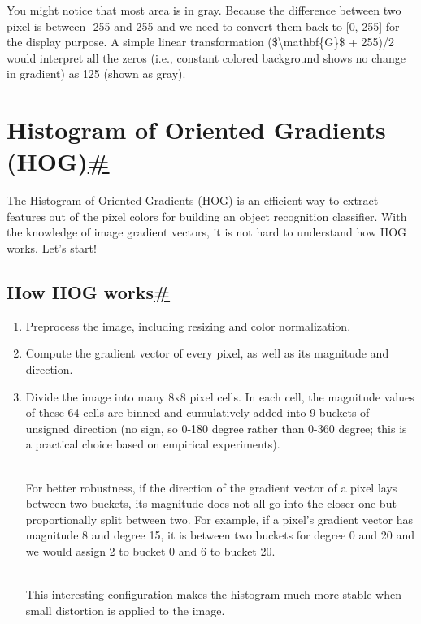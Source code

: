 You might notice that most area is in gray. Because the difference between two pixel is between -255 and 255 and we need to convert them back to {[}0, 255{]} for the display purpose. A simple linear transformation (\$\textbackslash mathbf\{G\}\$ + 255)/2 would interpret all the zeros (i.e., constant colored background shows no change in gradient) as 125 (shown as gray).

\section{\texorpdfstring{Histogram of Oriented Gradients (HOG)\hyperref[histogram-of-oriented-gradients-hog]{\#}}{Histogram of Oriented Gradients (HOG)\#}}\label{histogram-of-oriented-gradients-hog}

The Histogram of Oriented Gradients (HOG) is an efficient way to extract features out of the pixel colors for building an object recognition classifier. With the knowledge of image gradient vectors, it is not hard to understand how HOG works. Let's start!

\subsection{\texorpdfstring{How HOG works\hyperref[how-hog-works]{\#}}{How HOG works\#}}\label{how-hog-works}

\begin{enumerate}
\item
  Preprocess the image, including resizing and color normalization.
\item
  Compute the gradient vector of every pixel, as well as its magnitude and direction.
\item
  Divide the image into many 8x8 pixel cells. In each cell, the magnitude values of these 64 cells are binned and cumulatively added into 9 buckets of unsigned direction (no sign, so 0-180 degree rather than 0-360 degree; this is a practical choice based on empirical experiments).\\
  \strut \\
  For better robustness, if the direction of the gradient vector of a pixel lays between two buckets, its magnitude does not all go into the closer one but proportionally split between two. For example, if a pixel's gradient vector has magnitude 8 and degree 15, it is between two buckets for degree 0 and 20 and we would assign 2 to bucket 0 and 6 to bucket 20.\\
  \strut \\
  This interesting configuration makes the histogram much more stable when small distortion is applied to the image.
\end{enumerate}


